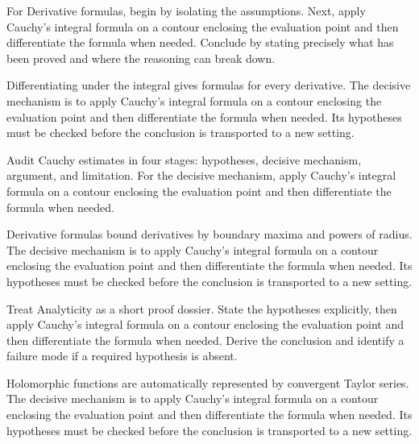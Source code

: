 \begin{problem}\label{prob:iv06-problem-03}
For Derivative formulas, begin by isolating the assumptions. Next, apply Cauchy's integral formula on a contour enclosing the evaluation point and then differentiate the formula when needed. Conclude by stating precisely what has been proved and where the reasoning can break down.
\end{problem}
\begin{solution}
Differentiating under the integral gives formulas for every derivative. The decisive mechanism is to apply Cauchy's integral formula on a contour enclosing the evaluation point and then differentiate the formula when needed. Its hypotheses must be checked before the conclusion is transported to a new setting.
\end{solution}

\begin{problem}\label{prob:iv06-problem-04}
Audit Cauchy estimates in four stages: hypotheses, decisive mechanism, argument, and limitation. For the decisive mechanism, apply Cauchy's integral formula on a contour enclosing the evaluation point and then differentiate the formula when needed.
\end{problem}
\begin{solution}
Derivative formulas bound derivatives by boundary maxima and powers of radius. The decisive mechanism is to apply Cauchy's integral formula on a contour enclosing the evaluation point and then differentiate the formula when needed. Its hypotheses must be checked before the conclusion is transported to a new setting.
\end{solution}

\begin{problem}\label{prob:iv06-problem-05}
Treat Analyticity as a short proof dossier. State the hypotheses explicitly, then apply Cauchy's integral formula on a contour enclosing the evaluation point and then differentiate the formula when needed. Derive the conclusion and identify a failure mode if a required hypothesis is absent.
\end{problem}
\begin{solution}
Holomorphic functions are automatically represented by convergent Taylor series. The decisive mechanism is to apply Cauchy's integral formula on a contour enclosing the evaluation point and then differentiate the formula when needed. Its hypotheses must be checked before the conclusion is transported to a new setting.
\end{solution}

